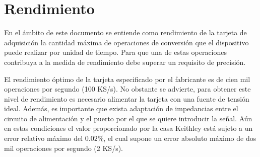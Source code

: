 \section{Rendimiento}\label{sec:throughput}

En el ámbito de este documento se entiende como rendimiento de la tarjeta de adquisición la cantidad máxima de operaciones de conversión que el dispositivo puede realizar por unidad de tiempo. Para que una de estas operaciones contribuya a la medida de rendimiento debe superar un requisito de precisión.\par
El rendimiento óptimo de la tarjeta \kpci{} especificado por el fabricante es de cien mil operaciones por segundo (100 KS/s). No obstante se advierte, para obtener este nivel de rendimiento es necesario alimentar la tarjeta con una fuente de tensión ideal. Además, es importante que exista adaptación de impedancias entre el circuito de alimentación y el puerto por el que se quiere introducir la señal. Aún en estas condiciones el valor proporcionado por la casa Keithley está sujeto a un error relativo máximo del $0.02\%$, el cual supone un error absoluto máximo de dos mil operaciones por segundo (2 KS/s).\par
